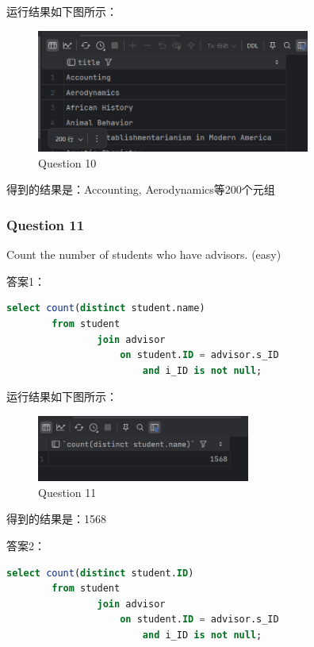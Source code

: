 \documentclass{article}
\begin{document}
    运行结果如下图所示：
    
    \begin{figure}[H]
    	\centering
    	\includegraphics[width=9cm]{./images/14.Question10.png}
    	\caption{Question 10}
    \end{figure}
    
    得到的结果是：Accounting, Aerodynamics等200个元组
    
    \subsubsection{Question 11}
    
    Count the number of students who have advisors.  (easy)
    
    答案1：
    
    \begin{lstlisting}[language=sql, title=Question 11, tabsize=4]
    	select count(distinct student.name)
    	from student
    			join advisor
    				on student.ID = advisor.s_ID
    					and i_ID is not null;
    \end{lstlisting}
    
    运行结果如下图所示：
    
    \begin{figure}[H]
    	\centering
    	\includegraphics[width=7cm]{./images/15.Question11-ans1.png}
    	\caption{Question 11}
    \end{figure}
    
    得到的结果是：1568
    
    
    答案2：
    
    \begin{lstlisting}[language=sql, title=Question 11, tabsize=4]
    	select count(distinct student.ID)
    	from student
    			join advisor
    				on student.ID = advisor.s_ID
    					and i_ID is not null;
    \end{lstlisting}
    
\end{document}
